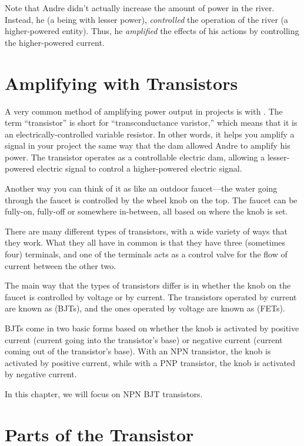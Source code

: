Note that Andre didn't actually increase the amount of power in the river.
Instead, he (a being with lesser power), \emph{controlled} the operation of the river (a higher-powered entity).
Thus, he \emph{amplified} the effects of his actions by controlling the higher-powered current.

\section{Amplifying with Transistors}

A very common method of amplifying power output in projects is with .
The term ``transistor'' is short for ``transconductance varistor,'' which means that it is an electrically-controlled variable resistor.
In other words, it helps you amplify a signal in your project the same way that the dam allowed Andre to amplify his power.
The transistor operates as a controllable electric dam, allowing a lesser-powered electric signal to control a higher-powered electric signal.

Another way you can think of it as like an outdoor faucet---the water going through the faucet is controlled by the wheel knob on the top.
The faucet can be fully-on, fully-off or somewhere in-between, all based on where the knob is set.

There are many different types of transistors, with a wide variety of ways that they work.
What they all have in common is that they have three (sometimes four) terminals, and one of the terminals acts as a control valve for the flow of current between the other two.


The main way that the types of transistors differ is in whether the knob on the faucet is controlled by voltage or by current.
The transistors operated by current are known as  (BJTs), and the ones operated by voltage are known as  (FETs).

BJTs come in two basic forms based on whether the knob is activated by positive current (current going into the transistor's base) or negative current (current coming out of the transistor's base).
With an NPN transistor, the knob is activated by positive current, while with a PNP transistor, the knob is activated by negative current.

In this chapter, we will focus on NPN BJT transistors.

\section{Parts of the Transistor}

